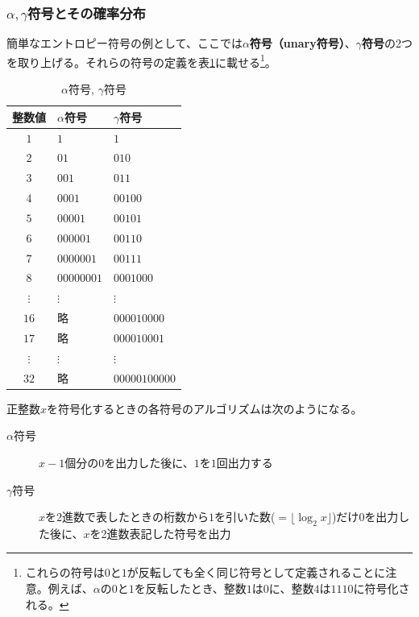 \documentclass[uplatex,dvipdfmx,b5j,10pt]{jsbook}
\theoremstyle{definition}
\begin{document}
\subsubsection{$\alpha, \gamma$符号とその確率分布} \label{alpha_and_gamma_code}

簡単なエントロピー符号の例として、ここでは\textbf{$\alpha$符号（unary符号）}、\textbf{$\gamma$符号}の2つを取り上げる。それらの符号の定義を表\ref{alpha_gamma_code}に載せる\footnote{これらの符号は$0$と$1$が反転しても全く同じ符号として定義されることに注意。例えば、$\alpha$の$0$と$1$を反転したとき、整数$1$は$0$に、整数$4$は$1110$に符号化される。}。

\begin{table}[htbp]
  \begin{center}
    \caption{$\alpha$符号, $\gamma$符号} \label{alpha_gamma_code}
    \begin{tabular}{c|l|l}
       整数値   & $\alpha$符号 & $\gamma$符号  \\ \hline
       $1$      & $1$          & $1$           \\
       $2$      & $01$         & $010$         \\
       $3$      & $001$        & $011$         \\
       $4$      & $0001$       & $00100$       \\
       $5$      & $00001$      & $00101$       \\
       $6$      & $000001$     & $00110$       \\
       $7$      & $0000001$    & $00111$       \\
       $8$      & $00000001$   & $0001000$     \\
       $\vdots$ & $\vdots$     & $\vdots$      \\
      $16$      & $略$         & $000010000$   \\
      $17$      & $略$         & $000010001$   \\
       $\vdots$ & $\vdots$     & $\vdots$      \\
      $32$      & $略$         & $00000100000$ \\
    \end{tabular}
  \end{center}
\end{table}

正整数$x$を符号化するときの各符号のアルゴリズムは次のようになる。
\begin{description}
  \item[$\alpha$符号] $x-1$個分の$0$を出力した後に、$1$を$1$回出力する
  \item[$\gamma$符号] $x$を2進数で表したときの桁数から$1$を引いた数($=\lfloor \log_{2} x \rfloor$)だけ$0$を出力した後に、$x$を2進数表記した符号を出力
\end{description}
\end{document}

